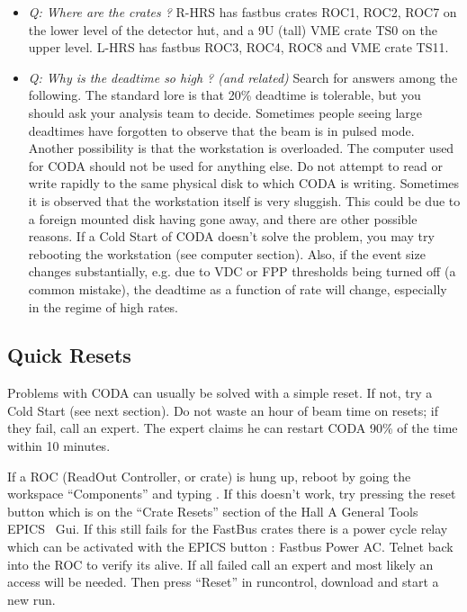 {{\begin{itemize}
\item{ {\it Q: Where are the crates ?} \hskip 0.05in
R-HRS has fastbus crates ROC1, ROC2, ROC7 on the lower level
of the detector hut, and a 9U (tall) VME crate TS0 on
the upper level.  L-HRS has fastbus ROC3, ROC4, ROC8 and
VME crate TS11.}

\item{ {\it Q: Why is the deadtime so high ?
(and related)} \hskip 0.1in
Search for answers among the following.
The standard lore is that 20\% deadtime is tolerable,
but you should ask your analysis team to decide.
Sometimes people seeing large deadtimes
have forgotten to observe that the beam is in
pulsed mode.  Another possibility is that the
workstation is overloaded.  The computer used
for CODA should not be used for anything else.
Do not attempt to read or write rapidly to the
same physical disk to which CODA is writing.
Sometimes it is observed that the workstation
itself is very sluggish.
This could be due to a foreign
mounted disk having gone away, and there are
other possible reasons.  If a Cold Start of CODA
doesn't solve the problem, you may
try rebooting the workstation
(see computer section).  Also, if
the event size changes substantially, e.g. due
to VDC or FPP thresholds being turned off (a common mistake),
the deadtime as a function
of rate will change, especially
in the regime of high rates.}

\end{itemize}

\subsection{ Quick Resets }

Problems with CODA can usually be solved with a simple
reset.  If not, try a Cold Start (see next section).
Do not waste an hour of beam time on resets;
if they fail, call an expert.
The expert claims he can restart CODA
90\% of the time within 10 minutes.

If a ROC (ReadOut Controller, or crate)
is hung up, reboot by going the workspace
``Components'' and typing .  If this
doesn't work, try pressing the reset button
which is on the ``Crate Resets'' section of the
Hall A General Tools EPICS~\cite{EPICSwww} Gui.
If this still fails for the FastBus crates there is a power cycle relay
which can be activated with the EPICS button : Fastbus Power AC.
 Telnet back into
the ROC to verify its alive.
If all failed call an expert and most likely an access will be needed.
Then press ``Reset''
in runcontrol, download and start a new run.

}}
